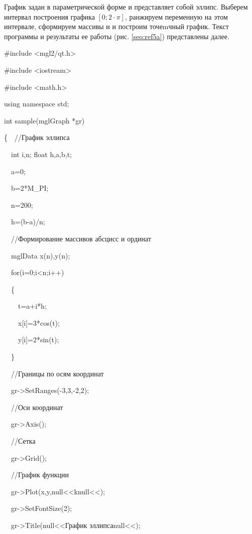 График задан в параметрической форме и представляет собой эллипс. Выберем интервал построения графика  $[0;2\cdot \pi
]$, ранжируем переменную  на этом интервале, сформируем массивы  и
 и построим точеmчный график. Текст программы и результаты ее работы (рис. \ref{seq:ref5a})
представлены далее.

{\upshape
\#include {\textless}mgl2/qt.h{\textgreater}}

{\upshape
\#include {\textless}iostream{\textgreater}}

{\upshape
\#include {\textless}math.h{\textgreater}}

{\upshape
using namespace std;}

{\upshape
int sample(mglGraph *gr)}

{\upshape
\{\ \ //График эллипса}

{\upshape
\ \ int i,n; float h,a,b,t;}

{\upshape
\ \ a=0;}

{\upshape
\ \ b=2*M\_PI;}

{\upshape
\ \ n=200;}

{\upshape
\ \ h=(b-a)/n;}

{\upshape
\ \ //Формирование массивов абсцисс и ординат}

{\upshape
\ \ mglData x(n),y(n);}

{\upshape
\ \ for(i=0;i{\textless}n;i++)}

{\upshape
\ \ \{}

{\upshape
\ \ \ \ t=a+i*h;}

{\upshape
\ \ \ \ x[i]=3*cos(t);}

{\upshape
\ \ \ \ y[i]=2*sin(t);}

{\upshape
\ \ \}}

{\upshape
\ \ //Границы по осям координат}

{\upshape
\ \ gr-{\textgreater}SetRanges(-3,3,-2,2);}

{\upshape
\ \ //Оси координат}

{\upshape
\ \ gr-{\textgreater}Axis();}

{\upshape
\ \ //Сетка}

{\upshape
\ \ gr-{\textgreater}Grid();}

{\upshape
\ \ //График функции}

{\upshape
\ \ gr-{\textgreater}Plot(x,y,null{<<}knull{<<});}

{\upshape
\ \ gr-{\textgreater}SetFontSize(2);}

{\upshape
\ \ gr-{\textgreater}Title(null{<<}График эллипсаnull{<<});}

